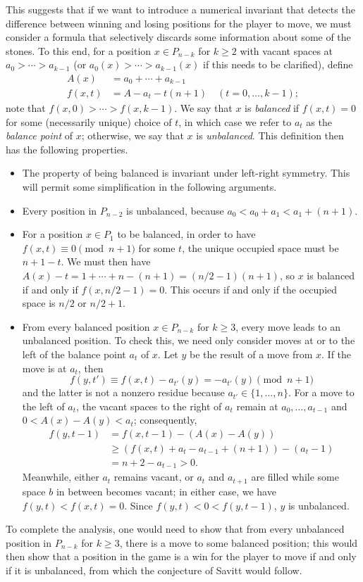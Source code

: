 \documentclass[amssymb,twocolumn,pra,10pt,aps]{revtex4-1}
\begin{document}
\begin{itemize}
This suggests that if we want to introduce a numerical invariant that detects the difference between winning and losing positions for the player to move, we must consider a formula that selectively discards some information about some of the stones. To this end, for a position $x \in P_{n-k}$ for $k \geq 2$ with vacant spaces at $a_0 > \cdots > a_{k-1}$
(or $a_0(x) > \cdots > a_{k-1}(x)$ if this needs to be clarified),
define
\begin{align*}
A(x) &= a_0 + \cdots + a_{k-1} \\
f(x,t) &= A - a_t - t(n+1) \quad (t=0,\dots,k-1);
\end{align*}
note that $f(x,0) > \cdots > f(x,k-1)$. We say that $x$ is \emph{balanced} if $f(x,t) = 0$ for some (necessarily unique) choice of $t$, in which case we refer to $a_t$ as the \emph{balance point} of $x$; otherwise, we say that
$x$ is \emph{unbalanced}.
This definition then has the following properties. 
\begin{itemize}
\item
The property of being balanced is invariant under left-right symmetry. This will permit some simplification in the following arguments.
\item
Every position in $P_{n-2}$ is unbalanced, because $a_0 < a_0 + a_1 < a_1 + (n+1)$.
\item
For a position $x \in P_1$ to be balanced,
in order to have $f(x,t) \equiv 0 \pmod{n+1}$ for some $t$,
the unique occupied space must be $n+1-t$. We must then have
$A(x) - t = 1 + \cdots + n - (n+1) = (n/2  -1)(n+1)$,
so $x$ is balanced if and only if $f(x, n/2 - 1) = 0$.
This occurs if and only if the occupied space is $n/2$ or $n/2 + 1$.
\item
From every balanced position $x \in P_{n-k}$ for $k \geq 3$, every move leads to an unbalanced position.
To check this, we need only consider moves at or to the left of the balance point $a_t$ of $x$.
Let $y$ be the result of a move from $x$. If the move is at $a_t$,
then
\[
f(y,t') \equiv f(x,t) - a_{t'}(y) = -a_{t'}(y) \pmod{n+1}
\]
and the latter is not a nonzero residue because $a_{t'} \in \{1,\dots,n\}$.
For a move to the left of $a_t$, the vacant spaces to the right of $a_t$ remain at $a_0,\dots,a_{t-1}$
and $0 < A(x) - A(y) < a_t$; consequently, 
\begin{align*}
f(y,t-1) &= f(x,t-1) - (A(x)-A(y)) \\
&\geq (f(x,t) + a_t - a_{t-1} + (n+1)) - (a_t - 1) \\
&= n+2 - a_{t-1} > 0.
\end{align*}
Meanwhile, either $a_t$ remains vacant, or $a_{t}$ and $a_{t+1}$ are filled while some space $b$ in between becomes vacant; in either case, we have $f(y,t) <f(x,t) = 0$.
Since $f(y,t) < 0 < f(y,t-1)$, $y$ is unbalanced.
\end{itemize}

To complete the analysis, one would need to show that from 
every unbalanced position in $P_{n-k}$ for $k \geq 3$, there is a move to some balanced position;
this would then show that a position in the game is a win for the player to move if and only if it is unbalanced,
from which the conjecture of Savitt would follow.

\end{itemize}
\end{document}

